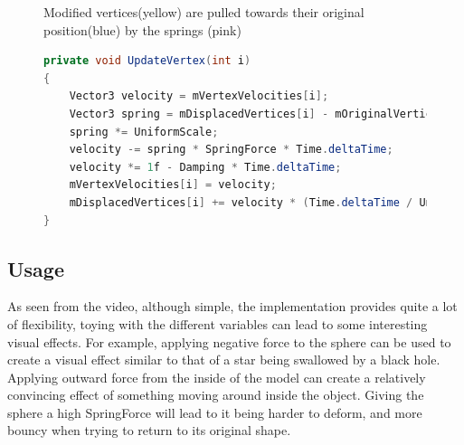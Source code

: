 
\begin{figure}
\centering
    \caption{Modified vertices(yellow) are pulled towards their original position(blue) by the springs (pink)\cite{catlike_mesh_deformation}}
    \label{fig:catlike_mesh_deformation_springs}
\end{figure}

\begin{figure}
\begin{lstlisting}[label={code:catlike_mesh_deformation_update},language=csharp,caption={Catlike coding mesh deformation vertex update}]
private void UpdateVertex(int i)
{
    Vector3 velocity = mVertexVelocities[i];
    Vector3 spring = mDisplacedVertices[i] - mOriginalVertices[i];
    spring *= UniformScale;
    velocity -= spring * SpringForce * Time.deltaTime;
    velocity *= 1f - Damping * Time.deltaTime;
    mVertexVelocities[i] = velocity;
    mDisplacedVertices[i] += velocity * (Time.deltaTime / UniformScale);
}
\end{lstlisting}
\end{figure}

\subsection{Usage}
As seen from the video, although simple, the implementation provides quite a lot of flexibility, toying with the different variables
can lead to some interesting visual effects.
For example, applying negative force to the sphere can be used to create a visual effect similar to that of a star being swallowed by a black hole.
Applying outward force from the inside of the model can create a relatively convincing effect of something moving around inside the object.
Giving the sphere a high SpringForce will lead to it being harder to deform, and more bouncy when trying to return to its original shape.


